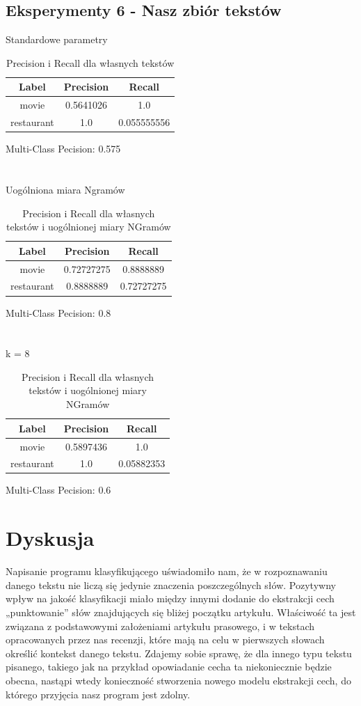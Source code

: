 \documentclass{classrep}
\begin{document}
\subsection{Eksperymenty 6 - Nasz zbiór tekstów}
Standardowe parametry
\begin{table}[H]
\begin{tabular}{|c|c|c|}
\hline
Label      & Precision & Recall      \\ \hline
movie      & 0.5641026 & 1.0         \\ \hline
restaurant & 1.0       & 0.055555556 \\ \hline
\end{tabular}
\caption{Precision i Recall dla własnych tekstów}
\end{table}
Multi-Class Pecision: 0.575\\
\\
\\
Uogólniona miara Ngramów
\begin{table}[H]
\begin{tabular}{|c|c|c|}
\hline
Label      & Precision  & Recall     \\ \hline
movie      & 0.72727275 & 0.8888889  \\ \hline
restaurant & 0.8888889  & 0.72727275 \\ \hline
\end{tabular}
\caption{Precision i Recall dla własnych tekstów i uogólnionej miary NGramów}
\end{table}
Multi-Class Pecision: 0.8\\
\\
\\
k = 8
\begin{table}[H]
\begin{tabular}{|c|c|c|}
\hline
Label      & Precision & Recall     \\ \hline
movie      & 0.5897436 & 1.0        \\ \hline
restaurant & 1.0       & 0.05882353 \\ \hline
\end{tabular}
\caption{Precision i Recall dla własnych tekstów i uogólnionej miary NGramów}
\end{table}
Multi-Class Pecision: 0.6

\section{Dyskusja}
	Napisanie programu klasyfikującego uświadomiło nam, że w rozpoznawaniu danego tekstu nie liczą się jedynie znaczenia poszczególnych słów. Pozytywny wpływ na jakość klasyfikacji miało między innymi dodanie do ekstrakcji cech „punktowanie” słów znajdujących się bliżej początku artykułu. Właściwość ta jest związana z podstawowymi założeniami artykułu prasowego, i w tekstach opracowanych przez nas recenzji, które mają na celu w pierwszych słowach określić kontekst danego tekstu. Zdajemy sobie sprawę, że dla innego typu tekstu pisanego, takiego jak na przykład opowiadanie cecha ta niekoniecznie będzie obecna, nastąpi wtedy konieczność stworzenia nowego modelu ekstrakcji cech, do którego przyjęcia nasz program jest zdolny.
	
\end{document}
